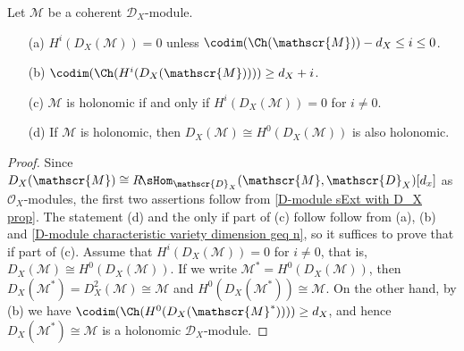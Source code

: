 \begin{proposition}\label{D-module dual of holonomic prop}
Let $\mathscr{M}$ be a coherent $\mathscr{D}_X$-module.
\begin{enumerate}
    \item[(a)] $H^i(D_X(\mathscr{M}))=0$ unless $\codim(\Ch(\mathscr{M}))-d_X\leq i\leq 0$.
    \item[(b)] $\codim(\Ch(H^i(D_X(\mathscr{M}))))\geq d_X+i$.
    \item[(c)] $\mathscr{M}$ is holonomic if and only if $H^i(D_X(\mathscr{M}))=0$ for $i\neq 0$.
    \item[(d)] If $\mathscr{M}$ is holonomic, then $D_X(\mathscr{M})\cong H^0(D_X(\mathscr{M}))$ is also holonomic.
\end{enumerate}
\end{proposition}
\begin{proof}
Since $D_X(\mathscr{M})\cong R\!\sHom_{\mathscr{D}_X}(\mathscr{M},\mathscr{D}_X)[d_x]$ as $\mathscr{O}_X$-modules, the first two assertions follow from \cref{D-module sExt with D_X prop}. The statement (d) and the only if part of (c) follow follow from (a), (b) and \cref{D-module characteristic variety dimension geq n}, so it suffices to prove that if part of (c). Assume that $H^i(D_X(\mathscr{M}))=0$ for $i\neq 0$, that is, $D_X(\mathscr{M})\cong H^0(D_X(\mathscr{M}))$. If we write $\mathscr{M}^*=H^0(D_X(\mathscr{M}))$, then $D_X(\mathscr{M}^*)=D^2_X(\mathscr{M})\cong\mathscr{M}$ and $H^0(D_X(\mathscr{M}^*))\cong \mathscr{M}$. On the other hand, by (b) we have $\codim(\Ch(H^0(D_X(\mathscr{M}^*))))\geq d_X$, and hence $D_X(\mathscr{M}^*)\cong\mathscr{M}$ is a holonomic $\mathscr{D}_X$-module.
\end{proof}

